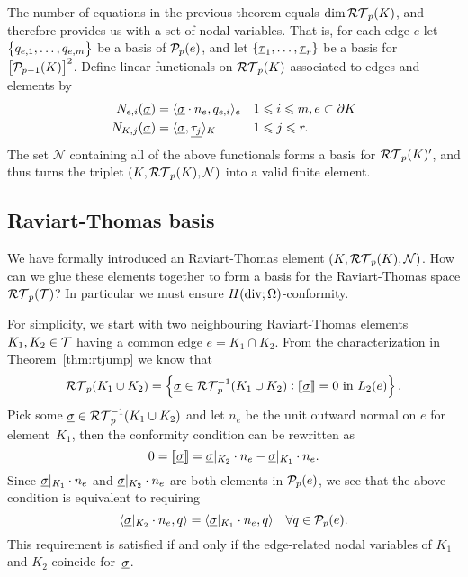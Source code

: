 \documentclass[thesis.tex]{subfiles}
\begin{document}
The number of equations in the previous theorem equals $\dim{\RT_p(K)}$, and therefore provides us with a
set of nodal variables. That is, for each edge $e$ let $\set{q_{e,1},\dots, q_{e,m}}$ be a basis of $\P_p(e)$, and let
 $\set{\vtau_1, \dots, \vtau_r}$ be a  basis for $\left[\P_{p-1}(K)\right]^2$. 
 Define linear functionals on $\RT_p(K)$ associated to edges and elements by
\begin{equation}
  \label{eq:nodalrt}
  \begin{alignedat}{2}
    N_{e,i}(\vsig) &= \ip{\vsig \cdot n_e, q_{e,i}}_e && \quad 1 \leq i \leq m,  e \subset \partial K\\
    N_{K,j}(\vsig) &= \ip{\vsig, \v{\tau_j}}_K &&\quad 1 \leq j \leq r.
  \end{alignedat}
\end{equation}
The set $\mathcal{N}$ containing all of the above functionals forms a basis for $\RT_p(K)'$, and thus
turns the triplet $(K, \RT_p(K), \mathcal{N})$ into a valid finite element.

\subsection{Raviart-Thomas basis}
We have formally introduced an Raviart-Thomas element $(K, \RT_p(K), \mathcal{N})$. How can we glue these elements
together to form a basis for the Raviart-Thomas space $\RT_p(\T)$? In particular we must ensure $H(\div; \O)$-conformity.

For simplicity, we start with two neighbouring Raviart-Thomas elements $K_1, K_2 \in  \T$ having a common edge $e = K_1 \cap K_2$.
From the characterization in Theorem~\ref{thm:rtjump} we know that
\[
\RT_p(K_1 \cup K_2) = \set{\vsig \in \RT_p^{-1}(K_1 \cup K_2) : \llbracket \vsig \rrbracket = 0 \text{ in } L_2(e)}.
\]
Pick some $\vsig \in \RT_p^{-1}(K_1 \cup K_2)$ and let $n_e$ be the unit outward normal on $e$ for element~$K_1$,
then the conformity condition can be rewritten as
\[
  0 = \llbracket \vsig \rrbracket  = \vsig|_{K_2} \cdot  n_e - \vsig|_{K_1} \cdot n_e.
\]
Since $\vsig|_{K_1} \cdot n_{e}$ and $\vsig|_{K_2} \cdot n_{e}$ are both elements in $\P_p(e)$, we see that 
the  above condition is equivalent to requiring
\[
  \ip{\vsig|_{K_2} \cdot n_e, q} = \ip{\vsig|_{K_1} \cdot n_e, q} \quad \forall q \in \P_p(e).
\]
This requirement is satisfied  if and only if the edge-related nodal variables of $K_1$ and $K_2$ coincide for~$\vsig$.
\end{document}
